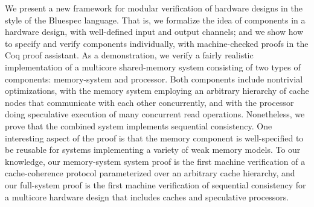 We present a new framework for modular verification of hardware designs in the
style of the Bluespec language.  That is, we formalize the idea of components
in a hardware design, with well-defined input and output channels; and we show
how to specify and verify components individually, with machine-checked proofs
in the Coq proof assistant.  As a demonstration, we verify a fairly realistic
implementation of a multicore shared-memory system consisting of two types of
components:  memory-system and processor.  Both components include nontrivial
optimizations, with the memory system employing an arbitrary hierarchy of cache
nodes that communicate with each other concurrently, and with the processor
doing speculative execution of many concurrent read operations.  Nonetheless,
we prove that the combined system implements sequential consistency.  One
interesting aspect of the proof is that the memory component is well-specified
to be reusable for systems implementing a variety of weak memory models.  To
our knowledge, our memory-system system proof is the first machine verification
of a cache-coherence protocol parameterized over an arbitrary cache hierarchy,
and our full-system proof is the first machine verification of sequential
consistency for a multicore hardware design that includes caches and
speculative processors.

